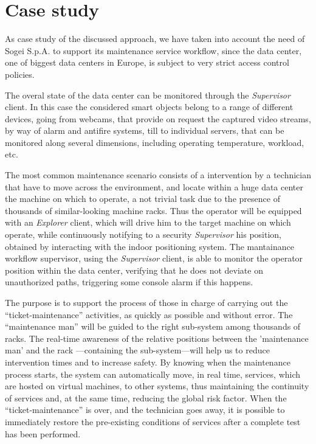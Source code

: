 \section{Case study}\label{case-study}

As case study of the discussed approach, we have taken into account the need of Sogei S.p.A. to support its maintenance service  workflow, since the data center, one of biggest data centers in Europe, is subject to very strict access control policies. 

The overal state of the data center can be monitored through the \emph{Supervisor} client. In this case the considered smart objects belong to a range of different devices, going from webcams, that provide on request the captured video streams, by way of alarm and antifire systems, till to individual servers, that can be monitored along several dimensions, including operating temperature, workload, etc. 

The most common maintenance scenario consists of a intervention by a technician that have to move across the environment, and locate within a huge data center the machine on which to operate, a not trivial task due to the presence of thousands of similar-looking machine racks. Thus the operator will be equipped with an \emph{Explorer} client, which will drive him to the target machine on which operate, while continuously notifying to a security \emph{Supervisor} his position, obtained by interacting with the indoor positioning system.
The mantainance workflow supervisor, using the \emph{Supervisor} client, is able to monitor the operator position within the data center, verifying that he does not deviate on unauthorized paths, triggering some console alarm if this happens.

The purpose is to support  the process of those in charge of carrying out the ``ticket-maintenance'' activities, as quickly  as possible and without error. The ``maintenance man'' will be guided to the right sub-system among thousands of racks. The real-time awareness of the relative positions between the 'maintenance man' and the rack ---containing the sub-system---will help us to reduce intervention times and to increase safety. By  knowing when the maintenance process starts, the system  can automatically move, in real time, services, which are hosted on virtual machines, to other systems, thus maintaining the continuity of services and, at the same time,  reducing  the global risk factor. When the ``ticket-maint\-enan\-ce'' is over, and the technician goes away, it is possible to immediately  restore  the pre-existing conditions of services after a complete test has been performed.




